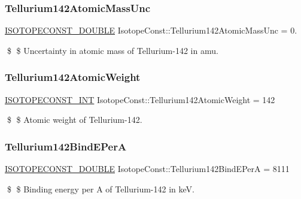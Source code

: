 \subsubsection{\texorpdfstring{Tellurium142\+Atomic\+Mass\+Unc}{Tellurium142AtomicMassUnc}}
{\footnotesize\ttfamily \mbox{\hyperlink{group___isotope_const-_macros_ga8f45a7272ce02c0b4c65c44636ed719a}{I\+S\+O\+T\+O\+P\+E\+C\+O\+N\+S\+T\+\_\+\+D\+O\+U\+B\+LE}} Isotope\+Const\+::\+Tellurium142\+Atomic\+Mass\+Unc = 0.}

\$ \$ Uncertainty in atomic mass of Tellurium-\/142 in amu. \mbox{\label{group___isotope_const-_tellurium-_te142_ga1ef6e88de1ebaacd9f0fd74e1378c84a}} 
\subsubsection{\texorpdfstring{Tellurium142\+Atomic\+Weight}{Tellurium142AtomicWeight}}
{\footnotesize\ttfamily \mbox{\hyperlink{group___isotope_const-_macros_ga5f18360b3e99483a35c32d789e62621c}{I\+S\+O\+T\+O\+P\+E\+C\+O\+N\+S\+T\+\_\+\+I\+NT}} Isotope\+Const\+::\+Tellurium142\+Atomic\+Weight = 142}

\$ \$ Atomic weight of Tellurium-\/142. \mbox{\label{group___isotope_const-_tellurium-_te142_gaf3457e7c3f6d38fa4d0ff089f64255e4}} 
\subsubsection{\texorpdfstring{Tellurium142\+Bind\+E\+PerA}{Tellurium142BindEPerA}}
{\footnotesize\ttfamily \mbox{\hyperlink{group___isotope_const-_macros_ga8f45a7272ce02c0b4c65c44636ed719a}{I\+S\+O\+T\+O\+P\+E\+C\+O\+N\+S\+T\+\_\+\+D\+O\+U\+B\+LE}} Isotope\+Const\+::\+Tellurium142\+Bind\+E\+PerA = 8111}

\$ \$ Binding energy per A of Tellurium-\/142 in keV. \mbox{\label{group___isotope_const-_tellurium-_te142_ga7dc6b8a4dc039143e81bc5b7ece02100}} 
